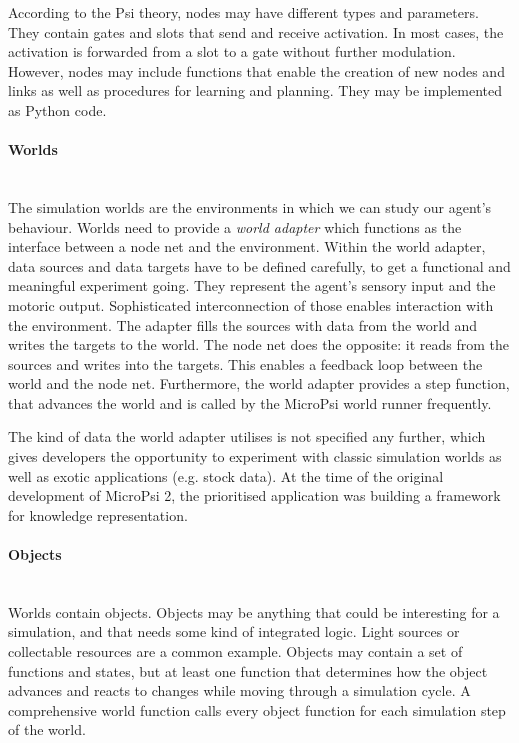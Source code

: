 According to the Psi theory, nodes may have different types and parameters. They contain gates and slots that send and receive activation. In most cases, the activation is forwarded from a slot to a gate without further modulation. However, nodes may include functions that enable the creation of new nodes and links as well as procedures for learning and planning. They may be implemented as Python code.

        \paragraph{Worlds}$\;$ \\
        \label{microPsiWorld}
The simulation worlds are the environments in which we can study our agent's behaviour. Worlds need to provide a \emph{world adapter} which functions as the interface between a node net and the environment. Within the world adapter, data sources and data targets have to be defined carefully, to get a functional and meaningful experiment going. They represent the agent's sensory input and the motoric output. Sophisticated interconnection of those enables interaction with the environment. The adapter fills the sources with data from the world and writes the targets to the world. The node net does the opposite: it reads from the sources and writes into the targets. This enables a feedback loop between the world and the node net. Furthermore, the world adapter provides a step function, that advances the world and is called by the MicroPsi world runner frequently.

The kind of data the world adapter utilises is not specified any further, which gives developers the opportunity to experiment with classic simulation worlds as well as exotic applications (e.g. stock data). At the time of the original development of MicroPsi 2, the prioritised application was building a framework for knowledge representation.

            \paragraph{Objects}$\;$ \\
Worlds contain objects. Objects may be anything that could be interesting for a simulation, and that needs some kind of integrated logic. Light sources or collectable resources are a common example. Objects may contain a set of functions and states, but at least one function that determines how the object advances and reacts to changes while moving through a simulation cycle. A comprehensive world function calls every object function for each simulation step of the world.

